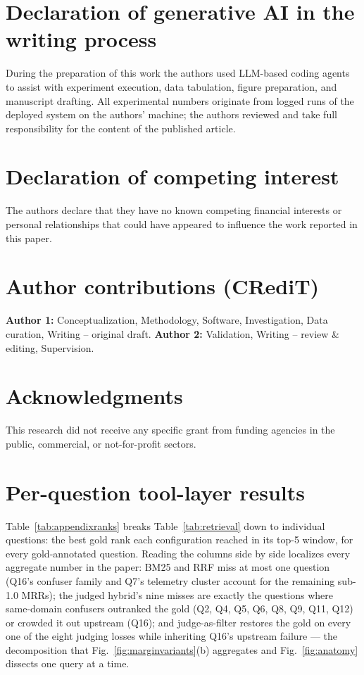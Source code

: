 \documentclass[preprint,12pt]{elsarticle}
\begin{document}
\section*{Declaration of generative AI in the writing process}
During the preparation of this work the authors used LLM-based coding
agents to assist with experiment execution, data tabulation, figure
preparation, and manuscript drafting. All experimental numbers originate
from logged runs of the deployed system on the authors' machine; the
authors reviewed and take full responsibility for the content of the
published article.

\section*{Declaration of competing interest}
The authors declare that they have no known competing financial interests
or personal relationships that could have appeared to influence the work
reported in this paper.

\section*{Author contributions (CRediT)}
\textbf{Author 1:} Conceptualization, Methodology, Software, Investigation,
Data curation, Writing -- original draft. \textbf{Author 2:} Validation,
Writing -- review \& editing, Supervision. %

\section*{Acknowledgments}
This research did not receive any specific grant from funding agencies in
the public, commercial, or not-for-profit sectors. %

\appendix
\setcounter{table}{0}
\section{Per-question tool-layer results}
\label{app:perq}
Table~\ref{tab:appendixranks} breaks Table~\ref{tab:retrieval} down to
individual questions: the best gold rank each configuration reached in
its top-5 window, for every gold-annotated question. Reading the columns
side by side localizes every aggregate number in the paper: BM25 and RRF
miss at most one question (Q16's confuser family and Q7's telemetry
cluster account for the remaining sub-1.0 MRRs); the judged hybrid's nine
misses are exactly the questions where same-domain confusers outranked
the gold (Q2, Q4, Q5, Q6, Q8, Q9, Q11, Q12) or crowded it out upstream
(Q16); and judge-as-filter restores the gold on every one of the eight
judging losses while inheriting Q16's upstream failure --- the
decomposition that Fig.~\ref{fig:marginvariants}(b) aggregates and
Fig.~\ref{fig:anatomy} dissects one query at a time.





\end{document}
